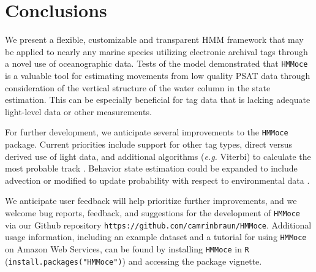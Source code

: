 \section{Conclusions}

We present a flexible, customizable and transparent HMM framework that
may be applied to nearly any marine species utilizing electronic
archival tags through a novel use of oceanographic data. Tests of the
model demonstrated that \texttt{HMMoce} is a valuable tool for
estimating movements from low quality PSAT data through consideration of
the vertical structure of the water column in the state estimation. This
can be especially beneficial for tag data that is lacking adequate
light-level data or other measurements.

For further development, we anticipate several improvements to the
\texttt{HMMoce} package. Current priorities include support for other
tag types, direct versus derived use of light data, and additional
algorithms (\emph{e.g.} Viterbi) to calculate the most probable track
\citep{Pedersen2011}. Behavior state estimation could be expanded to
include advection or modified to update probability with respect to
environmental data \citep{Patterson2009}.

We anticipate user feedback will help prioritize further improvements,
and we welcome bug reports, feedback, and suggestions for the
development of \texttt{HMMoce} via our Github repository
\texttt{https://github.com/camrinbraun/HMMoce}. Additional usage
information, including an example dataset and a tutorial for using
\texttt{HMMoce} on Amazon Web Services, can be found by installing
\texttt{HMMoce} in \texttt{R} (\texttt{install.packages("HMMoce")}) and
accessing the package vignette.
